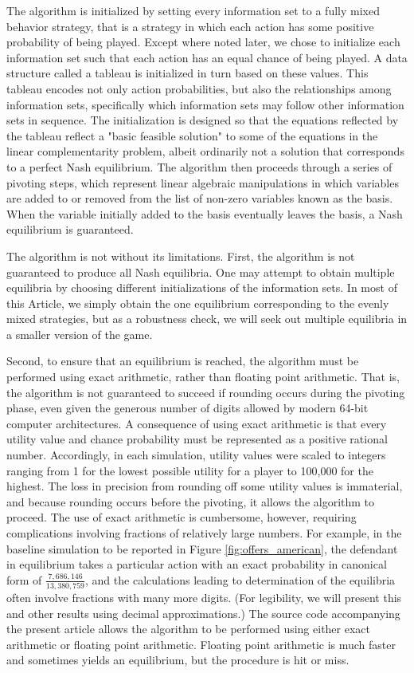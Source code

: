 \documentclass{article}
\begin{document}
The algorithm is initialized by setting every information set to a fully mixed behavior strategy, that is a strategy in which each action has some positive probability of being played. Except where noted later, we chose to initialize each information set such that each action has an equal chance of being played. A data structure called a tableau is initialized in turn based on these values. This tableau encodes not only action probabilities, but also the relationships among information sets, specifically which information sets may follow other information sets in sequence. The initialization is designed so that the equations reflected by the tableau reflect a "basic feasible solution" to some of the equations in the linear complementarity problem, albeit ordinarily not a solution that corresponds to a perfect Nash equilibrium.  The algorithm then proceeds through a series of pivoting steps, which represent  linear algebraic manipulations in which variables are added to or removed from the list of non-zero variables known as the basis. When the variable initially added to the basis eventually leaves the basis, a Nash equilibrium is guaranteed.

The algorithm is not without its limitations. First, the algorithm is not guaranteed to produce all Nash equilibria. One may attempt to obtain multiple equilibria by choosing different initializations of the information sets. In most of this Article, we simply obtain the one equilibrium corresponding to the evenly mixed strategies, but as a robustness check, we will seek out multiple equilibria in a smaller version of the game. 

Second, to ensure that an equilibrium is reached, the algorithm must be performed using exact arithmetic, rather than floating point arithmetic. That is, the algorithm is not guaranteed to succeed if rounding occurs during the pivoting phase, even given the generous number of digits allowed by modern 64-bit computer architectures. A consequence of using exact arithmetic is that every utility value and chance probability must be represented as a positive rational number. Accordingly, in each simulation, utility values were scaled to integers ranging from 1 for the lowest possible utility for a player to 100,000 for the highest. The loss in precision from rounding off some utility values is immaterial, and because rounding occurs before the pivoting, it allows the algorithm to proceed. The use of exact arithmetic is cumbersome, however, requiring complications involving fractions of relatively large numbers. For example, in the baseline simulation to be reported in Figure \ref{fig:offers_american}, the defendant in equilibrium takes a particular action with an exact probability in canonical form of $\frac{7,686,146}{13,380,759}$, and the calculations leading to determination of the equilibria often involve fractions with many more digits. (For legibility, we will present this and other results using decimal approximations.) The source code accompanying the present article allows the algorithm to be performed using either exact arithmetic or floating point arithmetic. Floating point arithmetic is much faster and sometimes yields an equilibrium, but the procedure is hit or miss.
\end{document}
